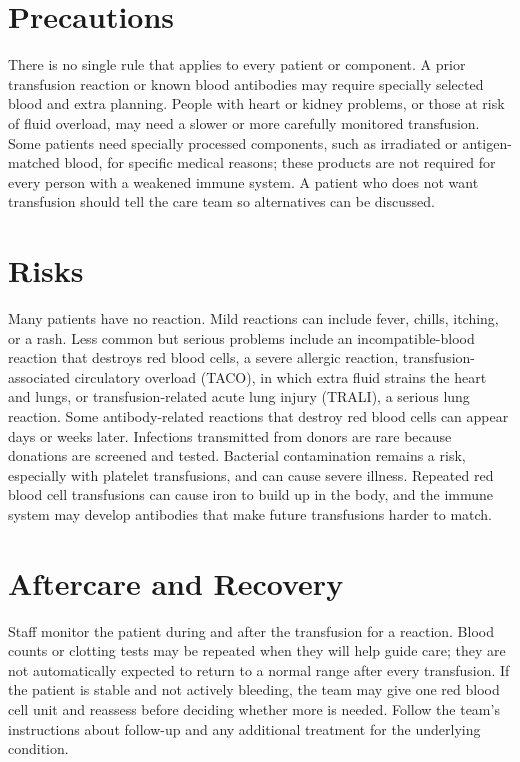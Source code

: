 \section*{Precautions}
There is no single rule that applies to every patient or component. A prior transfusion reaction or known blood antibodies may require specially selected blood and extra planning. People with heart or kidney problems, or those at risk of fluid overload, may need a slower or more carefully monitored transfusion. Some patients need specially processed components, such as irradiated or antigen-matched blood, for specific medical reasons; these products are not required for every person with a weakened immune system. A patient who does not want transfusion should tell the care team so alternatives can be discussed.

\section*{Risks}
Many patients have no reaction. Mild reactions can include fever, chills, itching, or a rash. Less common but serious problems include an incompatible-blood reaction that destroys red blood cells, a severe allergic reaction, transfusion-associated circulatory overload (TACO), in which extra fluid strains the heart and lungs, or transfusion-related acute lung injury (TRALI), a serious lung reaction. Some antibody-related reactions that destroy red blood cells can appear days or weeks later. Infections transmitted from donors are rare because donations are screened and tested. Bacterial contamination remains a risk, especially with platelet transfusions, and can cause severe illness. Repeated red blood cell transfusions can cause iron to build up in the body, and the immune system may develop antibodies that make future transfusions harder to match.

\section*{Aftercare and Recovery}
Staff monitor the patient during and after the transfusion for a reaction. Blood counts or clotting tests may be repeated when they will help guide care; they are not automatically expected to return to a normal range after every transfusion. If the patient is stable and not actively bleeding, the team may give one red blood cell unit and reassess before deciding whether more is needed. Follow the team's instructions about follow-up and any additional treatment for the underlying condition.

